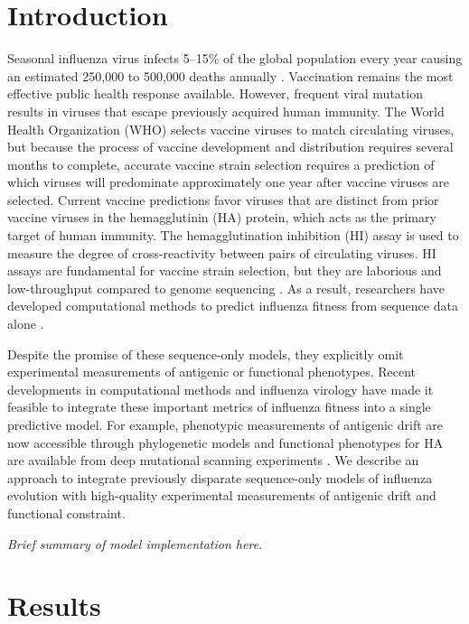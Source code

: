 
\section*{Introduction}

Seasonal influenza virus infects 5--15\% of the global population every year causing an estimated 250,000 to 500,000 deaths annually \cite{flufactsheet}.
Vaccination remains the most effective public health response available.
However, frequent viral mutation results in viruses that escape previously acquired human immunity.
The World Health Organization (WHO) selects vaccine viruses to match circulating viruses, but because the process of vaccine development and distribution requires several months to complete, accurate vaccine strain selection requires a prediction of which viruses will predominate approximately one year after vaccine viruses are selected.
Current vaccine predictions favor viruses that are distinct from prior vaccine viruses in the hemagglutinin (HA) protein, which acts as the primary target of human immunity.
The hemagglutination inhibition (HI) assay \cite{hirst1943studies} is used to measure the degree of cross-reactivity between pairs of circulating viruses.
HI assays are fundamental for vaccine strain selection, but they are laborious and low-throughput compared to genome sequencing \cite{Wood:2012ii}.
As a result, researchers have developed computational methods to predict influenza fitness from sequence data alone \cite{Luksza:2014hj,Steinbruck:2014kq,Neher:2014eu}.

Despite the promise of these sequence-only models, they explicitly omit experimental measurements of antigenic or functional phenotypes.
Recent developments in computational methods and influenza virology have made it feasible to integrate these important metrics of influenza fitness into a single predictive model.
For example, phenotypic measurements of antigenic drift are now accessible through phylogenetic models \cite{Neher:2016hy} and functional phenotypes for HA are available from deep mutational scanning experiments \cite{Lee2018}.
We describe an approach to integrate previously disparate sequence-only models of influenza evolution with high-quality experimental measurements of antigenic drift and functional constraint.

\textit{Brief summary of model implementation here.}

\section*{Results}

